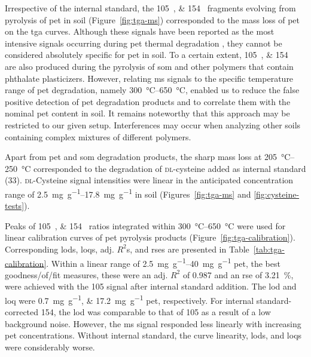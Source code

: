 Irrespective of the internal standard, the \SIlist{105;154}{\mz} fragments evolving from pyrolysis of \ac{pet} in soil (Figure~\ref{fig:tga-ms}) corresponded to the mass loss of \ac{pet} on the \ac{tga} curves.
Although these signals have been reported as the most intensive signals occurring during \ac{pet} thermal degradation \citep{DumichenFast2017,DimitrovAnalysis2013}, they cannot be considered absolutely specific for \ac{pet} in soil.
To a certain extent, \SIlist{105;154}{\mz} are also produced during the pyrolysis of \ac{som} \citep{SchultenThermal1999} and other polymers that contain phthalate plasticizers. However, relating \ac{ms} signals to the specific temperature range of \ac{pet} degradation, namely \SIrange{300}{650}{\degreeCelsius}, enabled us to reduce the false positive detection of \ac{pet} degradation products and to correlate them with the nominal \ac{pet} content in soil.
It remains noteworthy that this approach may be restricted to our given setup. Interferences may occur when analyzing other soils containing complex mixtures of different polymers.

Apart from \ac{pet} and \ac{som} degradation products, the sharp mass loss at \SIrange{205}{250}{\degreeCelsius} corresponded to the degradation of \textsc{dl}-cysteine added as internal standard (\SI{33}{\mz}). \textsc{dl}-Cysteine signal intensities were linear in the anticipated concentration range of \SIrange{2.5}{17.8}{\milli\gram\per\gram} in soil (Figures~\ref{fig:tga-ms} and \ref{fig:cysteine-tests}).

Peaks of \SIlist{105;154}{\mz} ratios integrated within \SIrange{300}{650}{\degreeCelsius} were used for linear calibration curves of \ac{pet} pyrolysis products (Figure~\ref{fig:tga-calibration}). Corresponding \acp{lod}, \acp{loq}, adj. $R^2$s, and \acp{rse} are presented in Table~\ref{tab:tga-calibration}.
Within a linear range of \SIrange{2.5}{40}{\milli\gram\per\gram} \ac{pet}, the best goodness\-/of\-/fit measures, these were an adj. $R^2$ of \num{0.987} and an \ac{rse} of \SI{3.21}{\percent}, were achieved with the \SI{105}{\mz} signal after internal standard addition.
The \ac{lod} and \ac{loq} were \SIlist{0.7;17.2}{\milli\gram\per\gram} \ac{pet}, respectively. For internal standard-corrected \SI{154}{\mz}, the \ac{lod} was comparable to that of \SI{105}{\mz} as a result of a low background noise.
However, the \ac{ms} signal responded less linearly with increasing \ac{pet} concentrations. Without internal standard, the curve linearity, \acp{lod}, and \acp{loq} were considerably worse.

